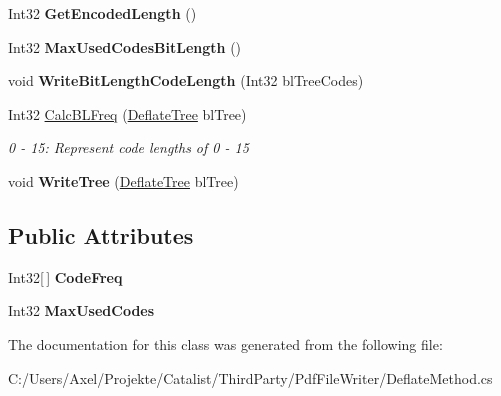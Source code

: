 \begin{DoxyCompactItemize}
\item 
Int32 {\bfseries Get\+Encoded\+Length} ()\hypertarget{class_pdf_file_writer_1_1_deflate_tree_a30879eee6f75a6b3118e169570b77d70}{}\label{class_pdf_file_writer_1_1_deflate_tree_a30879eee6f75a6b3118e169570b77d70}

\item 
Int32 {\bfseries Max\+Used\+Codes\+Bit\+Length} ()\hypertarget{class_pdf_file_writer_1_1_deflate_tree_a06c2ce6521b67ae0468e8e843994d43e}{}\label{class_pdf_file_writer_1_1_deflate_tree_a06c2ce6521b67ae0468e8e843994d43e}

\item 
void {\bfseries Write\+Bit\+Length\+Code\+Length} (Int32 bl\+Tree\+Codes)\hypertarget{class_pdf_file_writer_1_1_deflate_tree_ac8b9bb28c383e3ec8a408ad6801d7e67}{}\label{class_pdf_file_writer_1_1_deflate_tree_ac8b9bb28c383e3ec8a408ad6801d7e67}

\item 
Int32 \hyperlink{class_pdf_file_writer_1_1_deflate_tree_aff930d0c5233e4bcf17d8ff919c40a28}{Calc\+B\+L\+Freq} (\hyperlink{class_pdf_file_writer_1_1_deflate_tree}{Deflate\+Tree} bl\+Tree)\hypertarget{class_pdf_file_writer_1_1_deflate_tree_aff930d0c5233e4bcf17d8ff919c40a28}{}\label{class_pdf_file_writer_1_1_deflate_tree_aff930d0c5233e4bcf17d8ff919c40a28}

\begin{DoxyCompactList}\small\item\em 0 -\/ 15\+: Represent code lengths of 0 -\/ 15 \end{DoxyCompactList}\item 
void {\bfseries Write\+Tree} (\hyperlink{class_pdf_file_writer_1_1_deflate_tree}{Deflate\+Tree} bl\+Tree)\hypertarget{class_pdf_file_writer_1_1_deflate_tree_a0fe4f1582536c00617a6d7c134b2372a}{}\label{class_pdf_file_writer_1_1_deflate_tree_a0fe4f1582536c00617a6d7c134b2372a}

\end{DoxyCompactItemize}
\subsection*{Public Attributes}
\begin{DoxyCompactItemize}
\item 
Int32\mbox{[}$\,$\mbox{]} {\bfseries Code\+Freq}\hypertarget{class_pdf_file_writer_1_1_deflate_tree_aa039c34831bd532b6a55a0dfb735d979}{}\label{class_pdf_file_writer_1_1_deflate_tree_aa039c34831bd532b6a55a0dfb735d979}

\item 
Int32 {\bfseries Max\+Used\+Codes}\hypertarget{class_pdf_file_writer_1_1_deflate_tree_ae160652f8d60f0166e19a771d7b81c59}{}\label{class_pdf_file_writer_1_1_deflate_tree_ae160652f8d60f0166e19a771d7b81c59}

\end{DoxyCompactItemize}


The documentation for this class was generated from the following file\+:\begin{DoxyCompactItemize}
\item 
C\+:/\+Users/\+Axel/\+Projekte/\+Catalist/\+Third\+Party/\+Pdf\+File\+Writer/Deflate\+Method.\+cs\end{DoxyCompactItemize}

